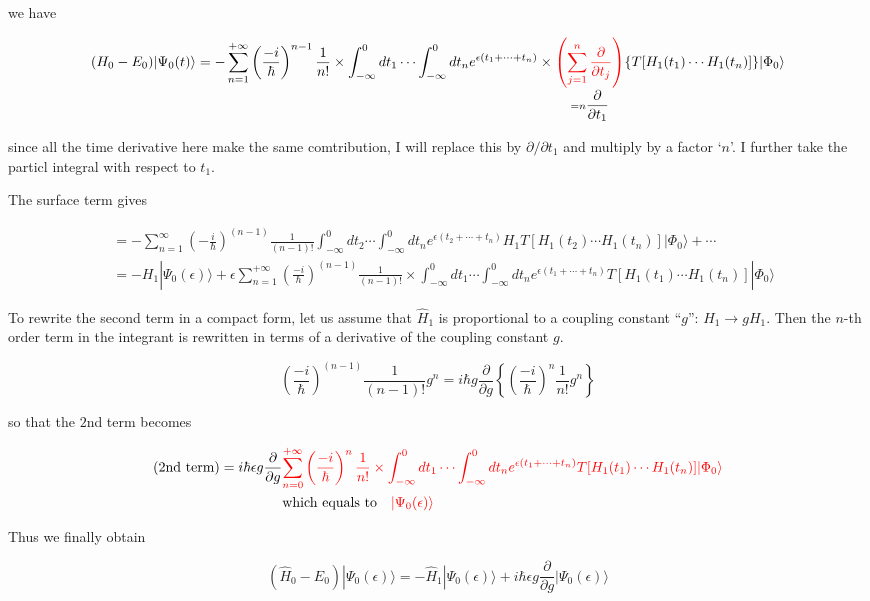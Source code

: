 we have

\[(H_0-E_0)|\Psi_0(t)\rangle = -\sum_{n=1}^{+\infty}\left(\frac{-i}{\hbar}\right)^{n-1}\frac{1}{n!}\times\int_{-\infty}^0dt_1\cdots\int_{-\infty}^0dt_n e^{\epsilon(t_1+\cdots+t_n)}\times\underset{=n\displaystyle\frac{\partial}{\partial t_1}}{{\color{red}{\left(\sum_{j=1}^n\frac{\partial}{\partial t_j}\right)}}}
\{T[H_1(t_1)\cdots H_1(t_n)]\}|\Phi_0\rangle \]

since all the time derivative here make the same comtribution, I will replace this by $\partial/\partial t_1$ and multiply by a factor `$n$'. I further take the particl integral with respect to $t_1$. 

The surface term gives

\[\begin{split}
&=-\sum_{n=1}^{\infty}\left(-\frac{i}{\hbar}\right)^{(n-1)}\frac{1}{(n-1)!}\int_{-\infty}^0 dt_2\cdots\int_{-\infty}^0 dt_n e^{\epsilon(t_2+\cdots+t_n)}H_1T[H_1(t_2)\cdots H_1(t_n)]|\Phi_0\rangle + \cdots\\
&=-H_1|\Psi_0(\epsilon)\rangle + \epsilon\sum_{n=1}^{+\infty}\left(\frac{-i}{\hbar}\right)^{(n-1)}\frac{1}{(n-1)!}\times \int_{-\infty}^0 dt_1\cdots\int_{-\infty}^0 dt_n e^{\epsilon(t_1+\cdots+t_n)}T[H_1(t_1)\cdots H_1(t_n)]|\Phi_0\rangle
\end{split}\]


To rewrite the second term in a compact form, let us assume that $\hat{H}_1$ is proportional to a coupling constant ``$g$'': $H_1\to gH_1$. Then the $n$-th order term in the integrant is rewritten in terms of a derivative of the coupling constant $g$. 

\[\left(\frac{-i}{\hbar}\right)^{(n-1)}\frac{1}{(n-1)!}g^n=i\hbar g\frac{\partial}{\partial g}\left\{\left(\frac{-i}{\hbar}\right)^n\frac{1}{n!}g^n\right\} \]

so that the $2$nd term becomes

\[\begin{split}
(2\text{nd term}) = i\hbar\epsilon g\frac{\partial}{\partial g} &{\color{red}{\sum_{n=0}^{+\infty}\left(\frac{-i}{\hbar}\right)^n\frac{1}{n!}\times \int_{-\infty}^0 dt_1\cdots \int_{-\infty}^0 dt_n e^{\epsilon(t_1+\cdots+t_n)}T[H_1(t_1)\cdots H_1(t_n)]|\Phi_0\rangle}}\\
&{\text{which equals to}} \quad {\color{red}{|\Psi_0(\epsilon)\rangle}}
\end{split}\]

Thus we finally obtain 

\[(\hat{H}_0-E_0)|\Psi_0(\epsilon)\rangle = -\hat{H}_1|\Psi_0(\epsilon)\rangle + i\hbar\epsilon g\frac{\partial}{\partial g}|\Psi_0(\epsilon)\rangle \]

